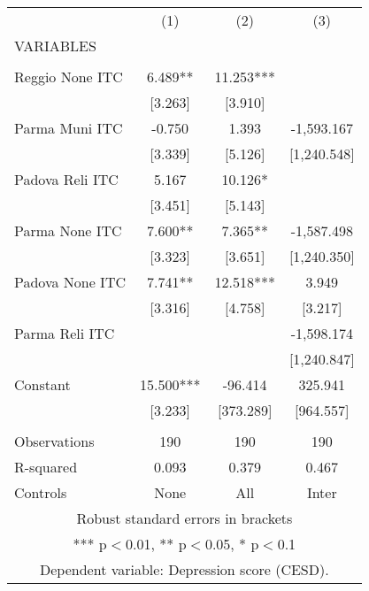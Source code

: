 \begin{tabular}{lccc} \hline
 & (1) & (2) & (3) \\
VARIABLES &  &  &  \\ \hline
 &  &  &  \\
Reggio None ITC & 6.489** & 11.253*** &  \\
 & [3.263] & [3.910] &  \\
Parma Muni ITC & -0.750 & 1.393 & -1,593.167 \\
 & [3.339] & [5.126] & [1,240.548] \\
Padova Reli ITC & 5.167 & 10.126* &  \\
 & [3.451] & [5.143] &  \\
Parma None ITC & 7.600** & 7.365** & -1,587.498 \\
 & [3.323] & [3.651] & [1,240.350] \\
Padova None ITC & 7.741** & 12.518*** & 3.949 \\
 & [3.316] & [4.758] & [3.217] \\
Parma Reli ITC &  &  & -1,598.174 \\
 &  &  & [1,240.847] \\
Constant & 15.500*** & -96.414 & 325.941 \\
 & [3.233] & [373.289] & [964.557] \\
 &  &  &  \\
Observations & 190 & 190 & 190 \\
R-squared & 0.093 & 0.379 & 0.467 \\
 Controls & None & All & Inter \\ \hline
\multicolumn{4}{c}{ Robust standard errors in brackets} \\
\multicolumn{4}{c}{ *** p$<$0.01, ** p$<$0.05, * p$<$0.1} \\
\multicolumn{4}{c}{ Dependent variable: Depression score (CESD).} \\
\end{tabular}
